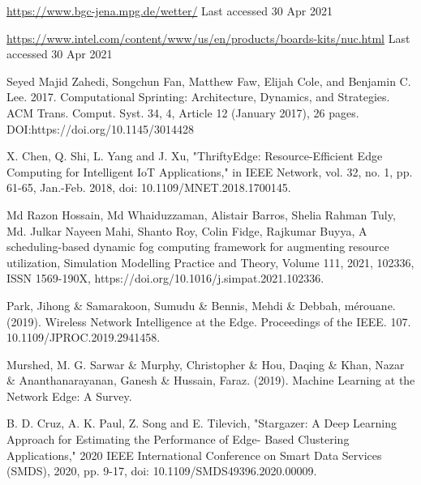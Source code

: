 \documentclass[runningheads]{llncs}
\begin{document}
\begin{thebibliography}{8}
\url{https://www.bgc-jena.mpg.de/wetter/} Last accessed 30 Apr 2021 

\url{https://www.intel.com/content/www/us/en/products/boards-kits/nuc.html} Last accessed 30 Apr 2021 









Seyed Majid Zahedi, Songchun Fan, Matthew Faw, Elijah Cole, and Benjamin C. Lee. 2017. Computational Sprinting: Architecture, Dynamics, and Strategies. ACM Trans. Comput. Syst. 34, 4, Article 12 (January 2017), 26 pages. DOI:https://doi.org/10.1145/3014428


X. Chen, Q. Shi, L. Yang and J. Xu, "ThriftyEdge: Resource-Efficient Edge Computing for Intelligent IoT Applications," in IEEE Network, vol. 32, no. 1, pp. 61-65, Jan.-Feb. 2018, doi: 10.1109/MNET.2018.1700145.


Md Razon Hossain, Md Whaiduzzaman, Alistair Barros, Shelia Rahman Tuly, Md. Julkar Nayeen Mahi, Shanto Roy, Colin Fidge, Rajkumar Buyya,
A scheduling-based dynamic fog computing framework for augmenting resource utilization,
Simulation Modelling Practice and Theory,
Volume 111, 2021, 102336, ISSN 1569-190X,
https://doi.org/10.1016/j.simpat.2021.102336.


Park, Jihong \& Samarakoon, Sumudu \& Bennis, Mehdi \& Debbah, mérouane. (2019). Wireless Network Intelligence at the Edge. Proceedings of the IEEE. 107. 10.1109/JPROC.2019.2941458. 


Murshed, M. G. Sarwar \& Murphy, Christopher \& Hou, Daqing \& Khan, Nazar \& Ananthanarayanan, Ganesh \& Hussain, Faraz. (2019). Machine Learning at the Network Edge: A Survey. 


B. D. Cruz, A. K. Paul, Z. Song and E. Tilevich, "Stargazer: A Deep Learning Approach for Estimating the Performance of Edge- Based Clustering Applications," 2020 IEEE International Conference on Smart Data Services (SMDS), 2020, pp. 9-17, doi: 10.1109/SMDS49396.2020.00009.



\end{thebibliography}
\end{document}
